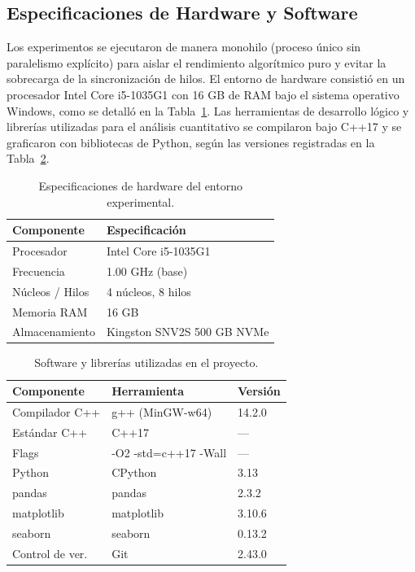 \documentclass[conference]{IEEEtran}
\begin{document}
\subsection{Especificaciones de Hardware y Software}

Los experimentos se ejecutaron de manera monohilo (proceso único sin paralelismo explícito) para aislar el rendimiento algorítmico puro y evitar la sobrecarga de la sincronización de hilos. El entorno de hardware consistió en un procesador Intel Core i5-1035G1 con 16 GB de RAM bajo el sistema operativo Windows, como se detalló en la Tabla~\ref{tab:hardware}. Las herramientas de desarrollo lógico y librerías utilizadas para el análisis cuantitativo se compilaron bajo C++17 y se graficaron con bibliotecas de Python, según las versiones registradas en la Tabla~\ref{tab:software}.

\begin{table}[H]
  \centering
  \caption{Especificaciones de hardware del entorno experimental.}
  \label{tab:hardware}
  \scriptsize
  \begin{tabular}{lp{4.2cm}}
    \toprule
    \textbf{Componente} & \textbf{Especificación} \\
    \midrule
    Procesador     & Intel Core i5-1035G1 \\
    Frecuencia     & 1.00 GHz (base) \\
    Núcleos / Hilos & 4 núcleos, 8 hilos \\
    Memoria RAM    & 16 GB \\
    Almacenamiento & Kingston SNV2S 500 GB NVMe \\
    \bottomrule
  \end{tabular}
\end{table}

\begin{table}[H]
  \centering
  \caption{Software y librerías utilizadas en el proyecto.}
  \label{tab:software}
  \scriptsize
  \begin{tabular}{lll}
    \toprule
    \textbf{Componente} & \textbf{Herramienta} & \textbf{Versión} \\
    \midrule
    Compilador C++ & g++ (MinGW-w64) & 14.2.0 \\
    Estándar C++   & C++17 & --- \\
    Flags          & -O2 -std=c++17 -Wall & --- \\
    Python         & CPython & 3.13 \\
    pandas \cite{pandas2024}   & pandas  & 2.3.2 \\
    matplotlib \cite{matplotlib2024} & matplotlib & 3.10.6 \\
    seaborn \cite{seaborn2024}  & seaborn & 0.13.2 \\
    Control de ver. & Git & 2.43.0 \\
    \bottomrule
  \end{tabular}
\end{table}
\end{document}
